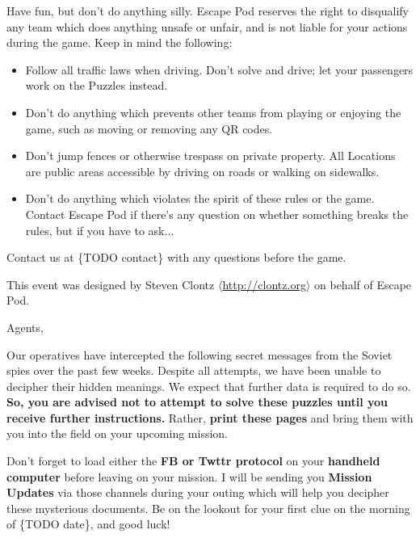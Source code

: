 \documentclass{puzzlehunt}
\begin{document}

Have fun, but don't do anything silly. Escape Pod reserves the right to
disqualify any team which does anything unsafe or unfair, and is not liable
for your actions during the game. Keep in mind the following:

\begin{itemize}
  \item Follow all traffic laws when driving. Don't solve and drive; let your
    passengers work on the Puzzles instead.
  \item Don't do anything which prevents other teams from playing or enjoying
    the game, such as moving or removing any QR codes.
  \item Don't jump fences or otherwise trespass on private property. All
    Locations are public areas accessible by driving on roads or walking on
    sidewalks.
  \item Don't do anything which violates the spirit of these rules or the game.
    Contact Escape Pod if there's any question on whether something breaks
    the rules, but if you have to ask...
\end{itemize}


Contact us at \{TODO contact\} with any questions before the game.

\vfill

{\footnotesize This event was designed by Steven Clontz
\(\langle\)\url{http://clontz.org}\(\rangle\) on behalf of Escape Pod.}



\noindent Agents,

Our operatives have intercepted the following secret messages from the
Soviet spies over the past few weeks. Despite all attempts, we have been
unable to decipher their hidden meanings. We expect that further data
is required to do so.
\textbf{So, you are advised not to attempt to solve these puzzles until you
receive further instructions.} Rather, \textbf{print these pages} and
bring them with you into the field on your upcoming mission.

Don't forget to load either the \textbf{FB or Twttr protocol} on your
\textbf{handheld computer} before leaving on your mission. I will be sending
you \textbf{Mission Updates} via those channels during your outing which
will help you decipher these mysterious documents. Be on the lookout for
your first clue on the morning of \{TODO date\}, and good luck!
\end{document}
